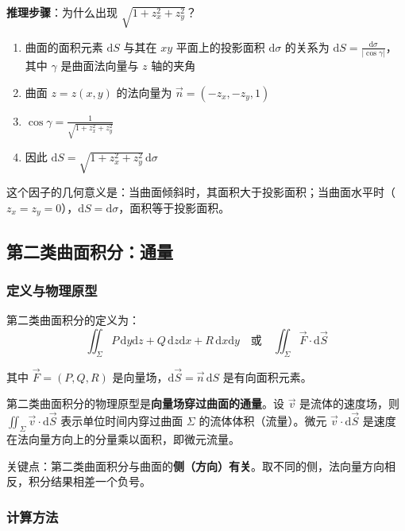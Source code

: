 \begin{insightbox}
\textbf{推理步骤}：为什么出现 $\sqrt{1+z_x^2+z_y^2}$？
\begin{enumerate}[leftmargin=2em]
    \item 曲面的面积元素 $\mathrm{d}S$ 与其在 $xy$ 平面上的投影面积 $\mathrm{d}\sigma$ 的关系为 $\mathrm{d}S = \frac{\mathrm{d}\sigma}{|\cos\gamma|}$，其中 $\gamma$ 是曲面法向量与 $z$ 轴的夹角
    \item 曲面 $z=z(x,y)$ 的法向量为 $\vec{n} = (-z_x, -z_y, 1)$
    \item $\cos\gamma = \frac{1}{\sqrt{1+z_x^2+z_y^2}}$
    \item 因此 $\mathrm{d}S = \sqrt{1+z_x^2+z_y^2}\,\mathrm{d}\sigma$
\end{enumerate}
这个因子的几何意义是：当曲面倾斜时，其面积大于投影面积；当曲面水平时（$z_x=z_y=0$），$\mathrm{d}S = \mathrm{d}\sigma$，面积等于投影面积。
\end{insightbox}

\subsection{第二类曲面积分：通量}

\subsubsection{定义与物理原型}

第二类曲面积分的定义为：
\[
\iint_\Sigma P\,\mathrm{d}y\mathrm{d}z + Q\,\mathrm{d}z\mathrm{d}x + R\,\mathrm{d}x\mathrm{d}y \quad \text{或} \quad \iint_\Sigma \vec{F}\cdot\mathrm{d}\vec{S}
\]

其中 $\vec{F} = (P, Q, R)$ 是向量场，$\mathrm{d}\vec{S} = \vec{n}\,\mathrm{d}S$ 是有向面积元素。

\begin{essencebox}
第二类曲面积分的物理原型是\textbf{向量场穿过曲面的通量}。设 $\vec{v}$ 是流体的速度场，则 $\iint_\Sigma \vec{v}\cdot\mathrm{d}\vec{S}$ 表示单位时间内穿过曲面 $\Sigma$ 的流体体积（流量）。微元 $\vec{v}\cdot\mathrm{d}\vec{S}$ 是速度在法向量方向上的分量乘以面积，即微元流量。

关键点：第二类曲面积分与曲面的\textbf{侧（方向）有关}。取不同的侧，法向量方向相反，积分结果相差一个负号。
\end{essencebox}

\subsubsection{计算方法}

